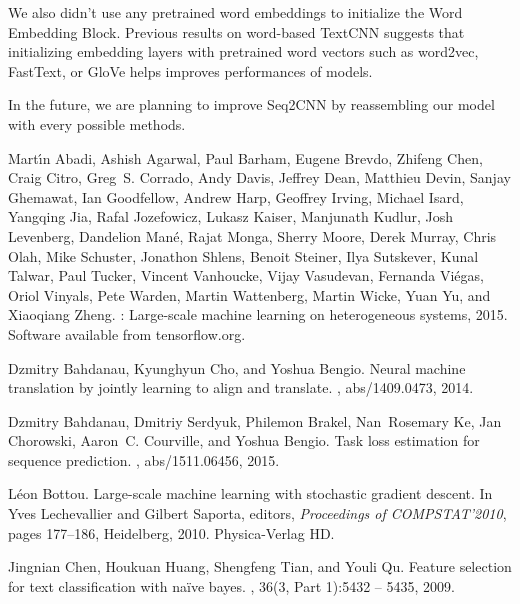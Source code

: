 \documentclass{article}
\begin{document}
We also didn't use any pretrained word embeddings to initialize the Word Embedding Block. Previous results on word-based TextCNN \cite{DBLP:journals/corr/Kim14f,DBLP:journals/corr/ZhangZL15,AAAI159745} suggests that initializing embedding layers with pretrained word vectors such as word2vec\cite{DBLP:journals/corr/MikolovSCCD13}, FastText\cite{DBLP:journals/corr/JoulinGBM16}, or GloVe\cite{pennington2014glove} helps improves performances of models.

In the future, we are planning to improve Seq2CNN by reassembling our model with every possible methods.



\begin{thebibliography}{10}

Mart\'{\i}n Abadi, Ashish Agarwal, Paul Barham, Eugene Brevdo, Zhifeng Chen,
  Craig Citro, Greg~S. Corrado, Andy Davis, Jeffrey Dean, Matthieu Devin,
  Sanjay Ghemawat, Ian Goodfellow, Andrew Harp, Geoffrey Irving, Michael Isard,
  Yangqing Jia, Rafal Jozefowicz, Lukasz Kaiser, Manjunath Kudlur, Josh
  Levenberg, Dandelion Man\'{e}, Rajat Monga, Sherry Moore, Derek Murray, Chris
  Olah, Mike Schuster, Jonathon Shlens, Benoit Steiner, Ilya Sutskever, Kunal
  Talwar, Paul Tucker, Vincent Vanhoucke, Vijay Vasudevan, Fernanda Vi\'{e}gas,
  Oriol Vinyals, Pete Warden, Martin Wattenberg, Martin Wicke, Yuan Yu, and
  Xiaoqiang Zheng.
: Large-scale machine learning on heterogeneous systems,
  2015.
\newblock Software available from tensorflow.org.

Dzmitry Bahdanau, Kyunghyun Cho, and Yoshua Bengio.
\newblock Neural machine translation by jointly learning to align and
  translate.
, abs/1409.0473, 2014.

Dzmitry Bahdanau, Dmitriy Serdyuk, Philemon Brakel, Nan~Rosemary Ke, Jan
  Chorowski, Aaron~C. Courville, and Yoshua Bengio.
\newblock Task loss estimation for sequence prediction.
, abs/1511.06456, 2015.

L{\'e}on Bottou.
\newblock Large-scale machine learning with stochastic gradient descent.
\newblock In Yves Lechevallier and Gilbert Saporta, editors, {\em Proceedings
  of COMPSTAT'2010}, pages 177--186, Heidelberg, 2010. Physica-Verlag HD.

Jingnian Chen, Houkuan Huang, Shengfeng Tian, and Youli Qu.
\newblock Feature selection for text classification with naïve bayes.
, 36(3, Part 1):5432 -- 5435,
  2009.


\end{thebibliography}
\end{document}
